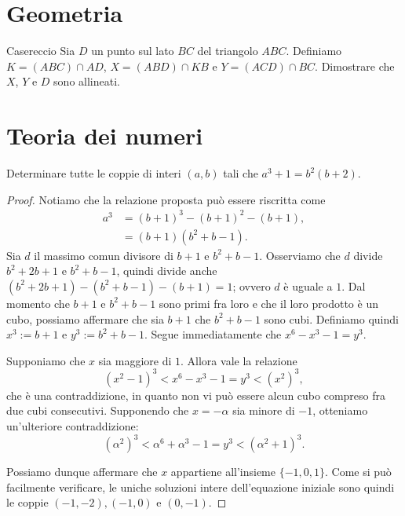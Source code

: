 \documentclass{article}
\begin{document}
\pagestyle{fancy}
\fancyhf{}
\fancyhead[R]{\nouppercase{\leftmark}}

\section{Geometria}

\begin{proposition}{Casereccio}{}
Sia $D$ un punto sul lato $BC$ del triangolo $ABC$. Definiamo
$K=(ABC)\cap AD$, $X=(ABD)\cap KB$ e $Y=(ACD)\cap BC$. Dimostrare che $X$, $Y$ e $D$
sono allineati.
\end{proposition}

\section{Teoria dei numeri}

\begin{proposition}{}{}
Determinare tutte le coppie di interi $(a,b)$ tali che $a^3+1=b^2(b+2)$.
\end{proposition}
\begin{proof}
	Notiamo che la relazione proposta può essere riscritta come
	\begin{align*}
		a^3 &= (b+1)^3-(b+1)^2-(b+1), \\
			 &= (b+1)(b^2+b-1).
	\end{align*}
	Sia $d$ il massimo comun divisore di $b+1$ e $b^2+b-1$. Osserviamo che $d$ divide
	$b^2+2b+1$ e $b^2+b-1$, quindi divide anche $(b^2+2b+1)-(b^2+b-1)-(b+1)=1$;
	ovvero $d$ è uguale a $1$.
	Dal momento che $b+1$ e $b^2+b-1$ sono primi fra loro e che il loro prodotto
	è un cubo, possiamo affermare che sia $b+1$ che $b^2+b-1$ sono cubi. Definiamo quindi
	$x^3:=b+1$ e $y^3:=b^2+b-1$. Segue immediatamente che $x^6-x^3-1=y^3$.

	Supponiamo che $x$ sia maggiore di $1$. Allora vale la relazione
	\begin{equation*}
		(x^2-1)^3 < x^6-x^3-1=y^3 < (x^2)^3,
	\end{equation*}
	che è una contraddizione, in quanto non vi può essere alcun cubo compreso
	fra due cubi consecutivi. Supponendo che $x=-\alpha$ sia
	minore di $-1$, otteniamo un'ulteriore contraddizione:
	\begin{equation*}
		(\alpha^2)^3 < \alpha^6 + \alpha^3 -1=y^3 < (\alpha^2+1)^3.
	\end{equation*}

	Possiamo dunque affermare che $x$ appartiene all'insieme $\{ -1,0,1 \}$.
	Come si può facilmente verificare,
	le uniche soluzioni intere dell'equazione iniziale sono quindi le coppie
	$(-1,-2),(-1,0)$ e $(0,-1)$.

\end{proof}
\end{document}

